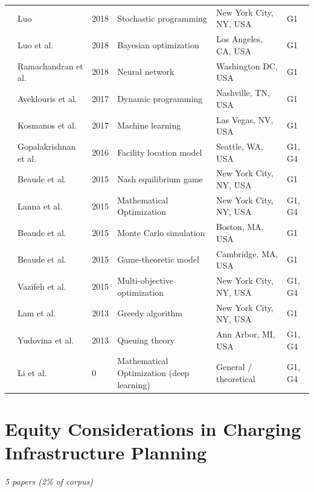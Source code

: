 \documentclass[letterpaper, 12pt, oneside, doublespacing]{Thesis}
\begin{document}
\begin{longtable}{L{0.9cm} L{2.2cm} L{0.8cm} L{3.3cm} L{2.5cm} L{1.5cm}}
\cite{engineering_and_2018} & Luo & 2018 & Stochastic programming & New York City, NY, USA & G1 \\
\cite{placement_of_2018} & Luo et al. & 2018 & Bayesian optimization & Los Angeles, CA, USA & G1 \\
\cite{predicting_electric_2018} & Ramachandran et al. & 2018 & Neural network & Washington DC, USA & G1 \\
\cite{electric_vehicle_2017} & Aveklouris et al. & 2017 & Dynamic programming & Nashville, TN, USA & G1 \\
\cite{route_optimization_2017} & Kosmanos et al. & 2017 & Machine learning & Las Vegas, NV, USA & G1 \\
\cite{demand_prediction_2016} & Gopalakrishnan et al. & 2016 & Facility location model & Seattle, WA, USA & G1, G4 \\
\cite{charging_games_2015} & Beaude et al. & 2015 & Nash equilibrium game & New York City, NY, USA & G1 \\
\cite{electric_vehicles_2015} & Lanna et al. & 2015 & Mathematical Optimization & New York City, NY, USA & G1, G4 \\
\cite{introducing_decentralized_2015} & Beaude et al. & 2015 & Monte Carlo simulation & Boston, MA, USA & G1 \\
\cite{minimizing_the_2015} & Beaude et al. & 2015 & Game-theoretic model & Cambridge, MA, USA & G1 \\
\cite{optimizing_the_2015} & Vazifeh et al. & 2015 & Multi-objective optimization & New York City, NY, USA & G1, G4 \\
\cite{electric_vehicle_2013} & Lam et al. & 2013 & Greedy algorithm & New York City, NY, USA & G1 \\
\cite{socially_optimal_2013} & Yudovina et al. & 2013 & Queuing theory & Ann Arbor, MI, USA & G1, G4 \\
\cite{electric_vehicle_0} & Li et al. & 0 & Mathematical Optimization (deep learning) & General {\slash} theoretical & G1, G4 \\
\bottomrule
\end{longtable}


\section{Equity Considerations in Charging Infrastructure Planning}

\textit{5 papers (2\% of corpus)}
\end{document}
